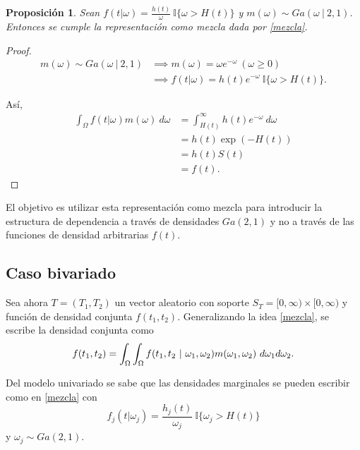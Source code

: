 \documentclass[11pt,a4paper]{article}
\newtheorem{proposition}{Proposición}[subsection]
\begin{document}
\begin{proposition}
Sean $f(t|\omega) = \frac{h(t)}{\omega} \ \mathbb{I}\lbrace\omega > H(t)\rbrace$ y $m(\omega)\sim Ga(\omega \ | \ 2, 1)$. Entonces se cumple la representación como mezcla dada por \eqref{mezcla}.
\end{proposition}

\begin{proof}
\begin{align*}
m(\omega) \sim Ga(\omega \ | \ 2, 1) &\implies m(\omega) = \omega e^{-\omega} \ (\omega\geq 0)\\
&\implies f(t|\omega) = h(t)e^{-\omega} \ \mathbb{I}\lbrace\omega > H(t)\rbrace.
\end{align*}

Así,
\begin{align*}
\int_\Omega f(t|\omega)m(\omega) \ d\omega &= \int_{H(t)}^\infty h(t)e^{-\omega} \ d\omega\\
&= h(t) \exp(-H(t))\\
&= h(t)S(t)\\
&= f(t).
\end{align*}
\end{proof}

El objetivo es utilizar esta representación como mezcla para introducir la estructura de dependencia a través de densidades $Ga(2, 1)$ y no a través de las funciones de densidad arbitrarias $f(t)$.\\

\subsection{Caso bivariado} \label{caso_bivariado}
Sea ahora $T=(T_1, T_2)$ un vector aleatorio con soporte $S_T = [0, \infty) \times [0, \infty)$ y función de densidad conjunta $f(t_1, t_2)$. Generalizando la idea \eqref{mezcla}, se escribe la densidad conjunta como
\begin{equation} \label{mezcla_conjunta}
f(t_1, t_2) =\int_\Omega\int_\Omega f(t_1, t_2 \ | \ \omega_1, \omega_2)m(\omega_1, \omega_2) \ d\omega_1 d\omega_2.\\
\end{equation}

Del modelo univariado se sabe que las densidades marginales se pueden escribir como en \eqref{mezcla} con
\begin{equation} \label{marginal}
f_j(t|\omega_j) = \frac{h_j(t)}{\omega_j} \ \mathbb{I}\lbrace\omega_j > H(t)\rbrace
\end{equation}
y $\omega_j \sim Ga(2, 1)$.\\
\end{document}
